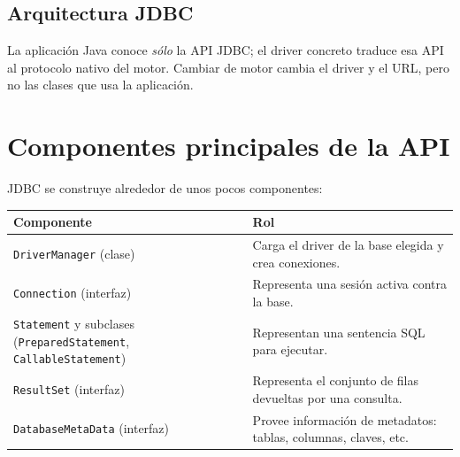 \documentclass[11pt,a4paper]{article}
\begin{document}
\subsection{Arquitectura JDBC}

\begin{center}
\end{center}

La aplicación Java conoce \emph{sólo} la API JDBC; el driver concreto
traduce esa API al protocolo nativo del motor. Cambiar de motor
cambia el driver y el URL, pero no las clases que usa la aplicación.

\section{Componentes principales de la API}

JDBC se construye alrededor de unos pocos componentes:

\begin{center}
\begin{tabular}{@{}p{4.4cm} p{9.5cm}@{}}
\toprule
\textbf{Componente} & \textbf{Rol} \\
\midrule
\texttt{DriverManager} (clase) &
Carga el driver de la base elegida y crea conexiones. \\
\texttt{Connection} (interfaz) &
Representa una sesión activa contra la base. \\
\texttt{Statement} y subclases (\texttt{PreparedStatement},
\texttt{CallableStatement}) &
Representan una sentencia SQL para ejecutar. \\
\texttt{ResultSet} (interfaz) &
Representa el conjunto de filas devueltas por una consulta. \\
\texttt{DatabaseMetaData} (interfaz) &
Provee información de metadatos: tablas, columnas, claves, etc. \\
\bottomrule
\end{tabular}
\end{center}
\end{document}
